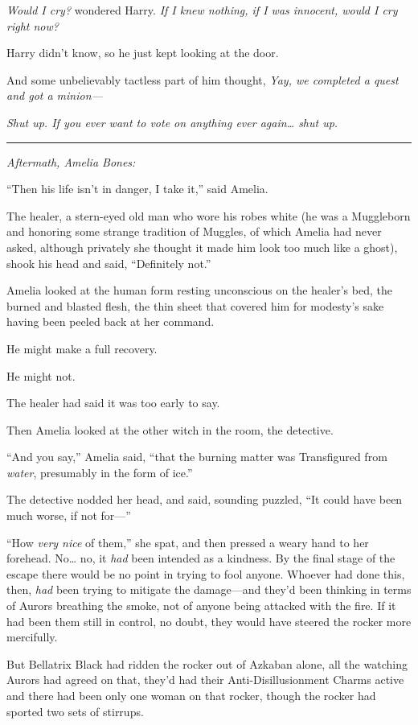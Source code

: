 \emph{Would I cry?} wondered Harry. \emph{If I knew nothing, if I was
innocent, would I cry right now?}

Harry didn't know, so he just kept looking at the door.

And some unbelievably tactless part of him thought, \emph{Yay, we
completed a quest and got a minion---}

\emph{Shut up. If you ever want to vote on anything ever again\ldots{}
shut up.}

\begin{center}\rule{3in}{0.4pt}\end{center}

\emph{Aftermath, Amelia Bones:}

``Then his life isn't in danger, I take it,'' said Amelia.

The healer, a stern-eyed old man who wore his robes white (he was a
Muggleborn and honoring some strange tradition of Muggles, of which
Amelia had never asked, although privately she thought it made him look
too much like a ghost), shook his head and said, ``Definitely not.''

Amelia looked at the human form resting unconscious on the healer's bed,
the burned and blasted flesh, the thin sheet that covered him for
modesty's sake having been peeled back at her command.

He might make a full recovery.

He might not.

The healer had said it was too early to say.

Then Amelia looked at the other witch in the room, the detective.

``And you say,'' Amelia said, ``that the burning matter was Transfigured
from \emph{water}, presumably in the form of ice.''

The detective nodded her head, and said, sounding puzzled, ``It could
have been much worse, if not for---''

``How \emph{very nice} of them,'' she spat, and then pressed a weary
hand to her forehead. No\ldots{} no, it \emph{had} been intended as a
kindness. By the final stage of the escape there would be no point in
trying to fool anyone. Whoever had done this, then, \emph{had} been
trying to mitigate the damage---and they'd been thinking in terms of
Aurors breathing the smoke, not of anyone being attacked with the fire.
If it had been them still in control, no doubt, they would have steered
the rocker more mercifully.

But Bellatrix Black had ridden the rocker out of Azkaban alone, all the
watching Aurors had agreed on that, they'd had their
Anti-Disillusionment Charms active and there had been only one woman on
that rocker, though the rocker had sported two sets of stirrups.

